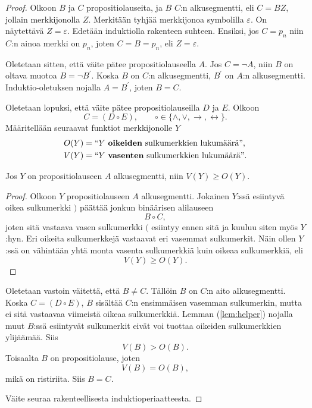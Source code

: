 \documentclass[11pt,a4paper]{amsart}
\begin{document}
\begin{proof}
Olkoon \(B\) ja \(C\) propositiolauseita, ja \(B\) \(C\):n alkusegmentti,
eli \(C = BZ\), jollain merkkijonolla \(Z\). Merkitään tyhjää
merkkijonoa symbolilla \(\varepsilon\). On näytettävä \(Z = \varepsilon\).
Edetään induktiolla rakenteen suhteen. Ensiksi, jos \(C = p_n\) niin
\(C\):n ainoa merkki on \(p_n\), joten \(C = B = p_n\), eli \(Z = \varepsilon\).

Oletetaan sitten, että väite pätee propositiolauseella \(A\). Jos
\(C = \neg A\), niin \(B\) on oltava muotoa \(B = \neg B^{'}\).
Koska \(B\) on \(C\):n alkusegmentti, \(B^{'}\) on \(A\):n alkusegmentti.
Induktio-oletuksen nojalla \(A = B^{'}\), joten \(B = C\).

Oletetaan lopuksi, että väite pätee propositiolauseilla \(D\) ja \(E\). Olkoon
\[
C = (D \circ E), \qquad
\circ \in \{\land, \lor, \rightarrow, \leftrightarrow\}.
\]
Määritellään seuraavat funktiot merkkijonolle \(Y\)
\[
\begin{aligned}
O(Y) &= \text{``\(Y\) \textbf{oikeiden} sulkumerkkien lukumäärä''}, \\
V(Y) &= \text{``\(Y\) \textbf{vasenten} sulkumerkkien lukumäärä''}.
\end{aligned}
\]
\begin{lemma}\label{lem:helper}
Jos \(Y\) on propositiolauseen \(A\) alkusegmentti, niin
\(V(Y) \geq O(Y)\).
\end{lemma}
\begin{proof}
Olkoon \(Y\) propositiolauseen \(A\) alkusegmentti. Jokainen \(Y\):ssä
esiintyvä oikea sulkumerkki \()\) päättää jonkun binäärisen alilauseen
\[B \circ C,\]
joten sitä vastaava vasen sulkumerkki \((\) esiintyy ennen sitä ja kuuluu
siten myös \(Y\):hyn. Eri oikeita sulkumerkkejä vastaavat eri vasemmat
sulkumerkit. Näin ollen \(Y\):ssä on vähintään yhtä monta vasenta
sulkumerkkiä kuin oikeaa sulkumerkkiä, eli
\[V(Y) \geq  O(Y).\]
\end{proof}
Oletetaan vastoin väitettä, että \(B \neq C\). Tällöin \(B\) on
\(C\):n aito alkusegmentti. Koska \(C=(D\circ E)\), \(B\) sisältää
\(C\):n ensimmäisen vasemman sulkumerkin, mutta ei sitä vastaavaa
viimeistä oikeaa sulkumerkkiä. Lemman (\ref{lem:helper}) nojalla muut \(B\):ssä
esiintyvät sulkumerkit eivät voi tuottaa oikeiden sulkumerkkien
ylijäämää. Siis
\[
V(B)>O(B).
\]
Toisaalta \(B\) on propositiolause, joten
\[
V(B)=O(B),
\]
mikä on ristiriita. Siis \(B=C\).

Väite seuraa rakenteellisesta induktioperiaatteesta.
\end{proof}
\end{document}
